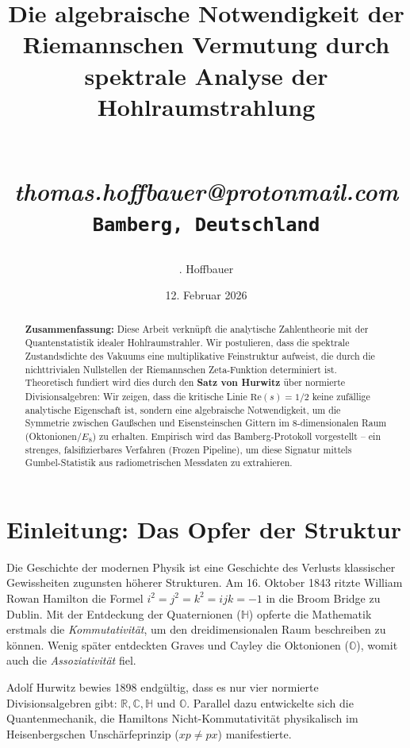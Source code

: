 \documentclass[11pt, a4paper]{article}
\title{\textbf{Die algebraische Notwendigkeit der Riemannschen Vermutung durch spektrale Analyse der Hohlraumstrahlung}

\author{
	\textbfT. Hoffbauer} \\
	\textit{thomas.hoffbauer@protonmail.com} \\
	\texttt{Bamberg, Deutschland}
}
\date{12. Februar 2026}
\begin{document}
	
	\maketitle
	
	\begin{abstract}
		\noindent
		\textbf{Zusammenfassung:} Diese Arbeit verknüpft die analytische Zahlentheorie mit der Quantenstatistik idealer Hohlraumstrahler. Wir postulieren, dass die spektrale Zustandsdichte des Vakuums eine multiplikative Feinstruktur aufweist, die durch die nichttrivialen Nullstellen der Riemannschen Zeta-Funktion determiniert ist. 
		Theoretisch fundiert wird dies durch den \textbf{Satz von Hurwitz} über normierte Divisionsalgebren: Wir zeigen, dass die kritische Linie $\text{Re}(s)=1/2$ keine zufällige analytische Eigenschaft ist, sondern eine algebraische Notwendigkeit, um die Symmetrie zwischen Gaußschen und Eisensteinschen Gittern im 8-dimensionalen Raum (Oktonionen/$E_8$) zu erhalten.
		Empirisch wird das \glqq Bamberg-Protokoll\grqq{} vorgestellt – ein strenges, falsifizierbares Verfahren (Frozen Pipeline), um diese Signatur mittels Gumbel-Statistik aus radiometrischen Messdaten zu extrahieren.
	\end{abstract}
	
	\section{Einleitung: Das Opfer der Struktur}
	
	Die Geschichte der modernen Physik ist eine Geschichte des Verlusts klassischer Gewissheiten zugunsten höherer Strukturen. Am 16. Oktober 1843 ritzte William Rowan Hamilton die Formel $i^2 = j^2 = k^2 = ijk = -1$ in die Broom Bridge zu Dublin. Mit der Entdeckung der Quaternionen ($\mathbb{H}$) opferte die Mathematik erstmals die \textit{Kommutativität}, um den dreidimensionalen Raum beschreiben zu können. Wenig später entdeckten Graves und Cayley die Oktonionen ($\mathbb{O}$), womit auch die \textit{Assoziativität} fiel.
	
	Adolf Hurwitz bewies 1898 endgültig, dass es nur vier normierte Divisionsalgebren gibt: $\mathbb{R}, \mathbb{C}, \mathbb{H}$ und $\mathbb{O}$. 
	Parallel dazu entwickelte sich die Quantenmechanik, die Hamiltons Nicht-Kommutativität physikalisch im Heisenbergschen Unschärfeprinzip ($xp \neq px$) manifestierte.
	
\end{document}
